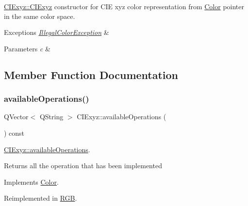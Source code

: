 \hyperlink{class_c_i_exyz_aea8a8b567ac89a96b0bf4c749a49ea90}{C\+I\+Exyz\+::\+C\+I\+Exyz} constructor for C\+IE xyz color representation from \hyperlink{class_color}{Color} pointer in the same color space. 


\begin{DoxyExceptions}{Exceptions}
{\em \hyperlink{class_illegal_color_exception}{Illegal\+Color\+Exception}} & \\
\hline
\end{DoxyExceptions}

\begin{DoxyParams}{Parameters}
{\em c} & \\
\hline
\end{DoxyParams}


\subsection{Member Function Documentation}
\mbox{\label{class_c_i_exyz_aa82a27c78ff425e06cdd740dd50e93b1}} 
\subsubsection{\texorpdfstring{available\+Operations()}{availableOperations()}}
{\footnotesize\ttfamily Q\+Vector$<$ Q\+String $>$ C\+I\+Exyz\+::available\+Operations (\begin{DoxyParamCaption}{ }\end{DoxyParamCaption}) const\hspace{0.3cm}{\ttfamily [virtual]}}



\hyperlink{class_c_i_exyz_aa82a27c78ff425e06cdd740dd50e93b1}{C\+I\+Exyz\+::available\+Operations}. 

\begin{DoxyReturn}{Returns}
all the operation that has been implemented 
\end{DoxyReturn}


Implements \hyperlink{class_color}{Color}.



Reimplemented in \hyperlink{class_r_g_b_a6cde5a9d00036c76fef2dd51ca8256a4}{R\+GB}.

\mbox{\label{class_c_i_exyz_aa93c7a293b63c7bce8d1fab9a185ab1b}} 
